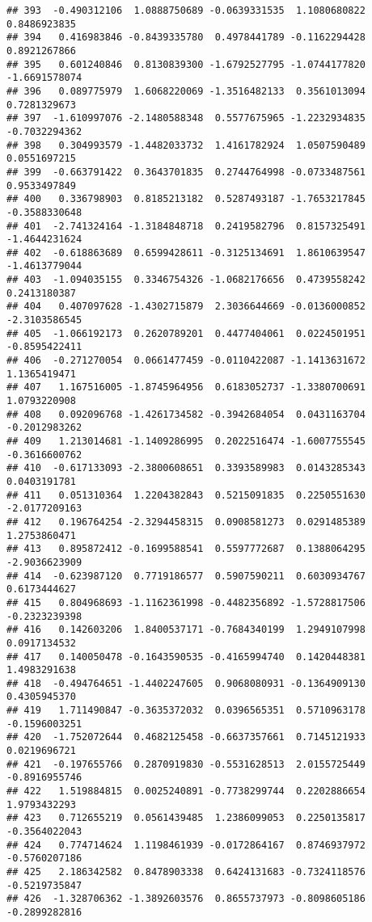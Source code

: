 \documentclass[
]{article}
\begin{document}
\begin{verbatim}
## 393  -0.490312106  1.0888750689 -0.0639331535  1.1080680822  0.8486923835
## 394   0.416983846 -0.8439335780  0.4978441789 -0.1162294428  0.8921267866
## 395   0.601240846  0.8130839300 -1.6792527795 -1.0744177820 -1.6691578074
## 396   0.089775979  1.6068220069 -1.3516482133  0.3561013094  0.7281329673
## 397  -1.610997076 -2.1480588348  0.5577675965 -1.2232934835 -0.7032294362
## 398   0.304993579 -1.4482033732  1.4161782924  1.0507590489  0.0551697215
## 399  -0.663791422  0.3643701835  0.2744764998 -0.0733487561  0.9533497849
## 400   0.336798903  0.8185213182  0.5287493187 -1.7653217845 -0.3588330648
## 401  -2.741324164 -1.3184848718  0.2419582796  0.8157325491 -1.4644231624
## 402  -0.618863689  0.6599428611 -0.3125134691  1.8610639547 -1.4613779044
## 403  -1.094035155  0.3346754326 -1.0682176656  0.4739558242  0.2413180387
## 404   0.407097628 -1.4302715879  2.3036644669 -0.0136000852 -2.3103586545
## 405  -1.066192173  0.2620789201  0.4477404061  0.0224501951 -0.8595422411
## 406  -0.271270054  0.0661477459 -0.0110422087 -1.1413631672  1.1365419471
## 407   1.167516005 -1.8745964956  0.6183052737 -1.3380700691  1.0793220908
## 408   0.092096768 -1.4261734582 -0.3942684054  0.0431163704 -0.2012983262
## 409   1.213014681 -1.1409286995  0.2022516474 -1.6007755545 -0.3616600762
## 410  -0.617133093 -2.3800608651  0.3393589983  0.0143285343  0.0403191781
## 411   0.051310364  1.2204382843  0.5215091835  0.2250551630 -2.0177209163
## 412   0.196764254 -2.3294458315  0.0908581273  0.0291485389  1.2753860471
## 413   0.895872412 -0.1699588541  0.5597772687  0.1388064295 -2.9036623909
## 414  -0.623987120  0.7719186577  0.5907590211  0.6030934767  0.6173444627
## 415   0.804968693 -1.1162361998 -0.4482356892 -1.5728817506 -0.2323239398
## 416   0.142603206  1.8400537171 -0.7684340199  1.2949107998  0.0917134532
## 417   0.140050478 -0.1643590535 -0.4165994740  0.1420448381  1.4983291638
## 418  -0.494764651 -1.4402247605  0.9068080931 -0.1364909130  0.4305945370
## 419   1.711490847 -0.3635372032  0.0396565351  0.5710963178 -0.1596003251
## 420  -1.752072644  0.4682125458 -0.6637357661  0.7145121933  0.0219696721
## 421  -0.197655766  0.2870919830 -0.5531628513  2.0155725449 -0.8916955746
## 422   1.519884815  0.0025240891 -0.7738299744  0.2202886654  1.9793432293
## 423   0.712655219  0.0561439485  1.2386099053  0.2250135817 -0.3564022043
## 424   0.774714624  1.1198461939 -0.0172864167  0.8746937972 -0.5760207186
## 425   2.186342582  0.8478903338  0.6424131683 -0.7324118576 -0.5219735847
## 426  -1.328706362 -1.3892603576  0.8655737973 -0.8098605186 -0.2899282816

\end{verbatim}
\end{document}
